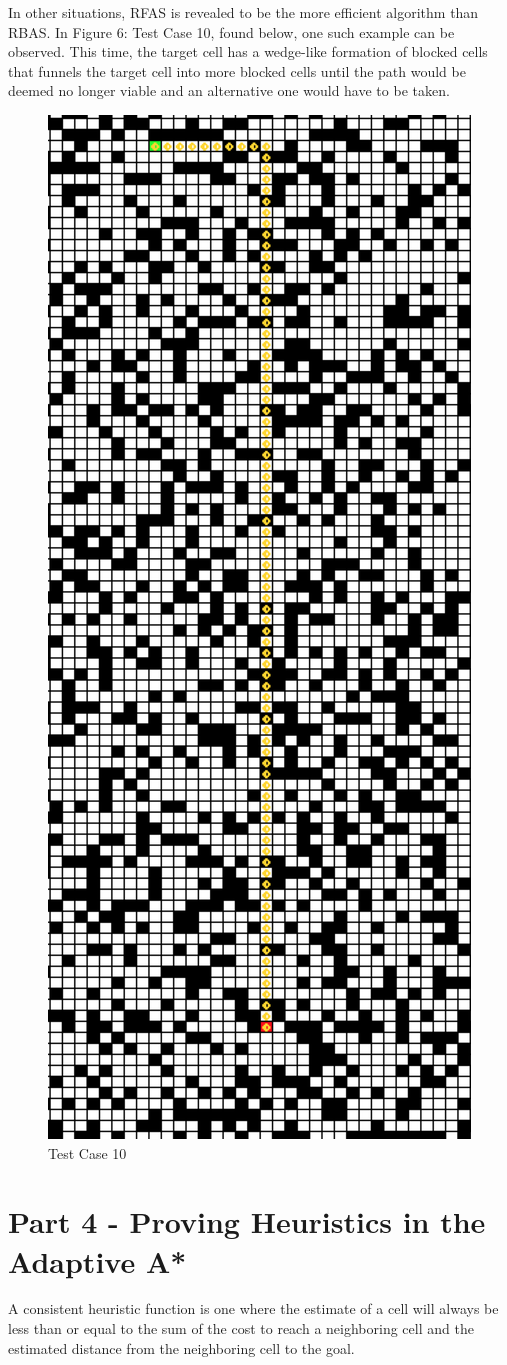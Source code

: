 \documentclass[12pt]{article}
\begin{document}
		In other situations, RFAS is revealed to be the more efficient algorithm than RBAS.  In Figure 6: Test Case 10, found below, one such example can be observed. This time, the target cell has a wedge-like formation of blocked cells that funnels the target cell into more blocked cells until the path would be deemed no longer viable and an alternative one would have to be taken.  
		\twocolumn
		\begin{figure}[!htb]
			\centering
			\includegraphics[width=.4\textwidth]{test10.png}
			\caption{Test Case 10}
		\end{figure}  
	
	\section*{Part 4 - Proving Heuristics in the Adaptive A*}
	
		A consistent heuristic function is one where the estimate of a cell will always be less than or equal to the sum of the cost to reach a neighboring cell and the estimated distance from the neighboring cell to the goal.
		
\end{document}
